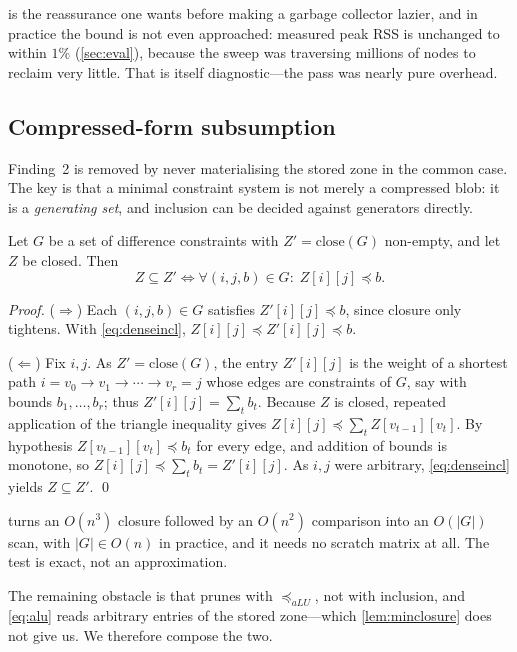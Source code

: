  is the reassurance one wants before making a garbage collector
lazier, and in practice the bound is not even approached: measured peak RSS is
unchanged to within $1\%$ (\cref{sec:eval}), because the sweep was traversing
millions of nodes to reclaim very little.  That is itself diagnostic---the pass
was nearly pure overhead.

\subsection{Compressed-form subsumption}\label{sec:filter}

Finding~2 is removed by never materialising the stored zone in the common case.
The key is that a minimal constraint system is not merely a compressed blob: it
is a \emph{generating set}, and inclusion can be decided against generators
directly.

\begin{lemma}\label{lem:minclosure}
Let $G$ be a set of difference constraints with $Z' = \mathrm{close}(G)$
non-empty, and let $Z$ be closed.  Then
\[
  Z \subseteq Z' \iff \forall (i,j,b) \in G:\; Z[i][j] \preceq b .
\]
\end{lemma}
\begin{proof}
($\Rightarrow$)  Each $(i,j,b) \in G$ satisfies $Z'[i][j] \preceq b$, since
closure only tightens.  With \cref{eq:denseincl}, $Z[i][j] \preceq Z'[i][j]
\preceq b$.

($\Leftarrow$)  Fix $i,j$.  As $Z' = \mathrm{close}(G)$, the entry $Z'[i][j]$ is
the weight of a shortest path $i = v_0 \to v_1 \to \cdots \to v_r = j$ whose
edges are constraints of $G$, say with bounds $b_1,\ldots,b_r$; thus $Z'[i][j] =
\sum_{t} b_t$.  Because $Z$ is closed, repeated application of the triangle
inequality gives $Z[i][j] \preceq \sum_t Z[v_{t-1}][v_t]$.  By hypothesis
$Z[v_{t-1}][v_t] \preceq b_t$ for every edge, and addition of bounds is monotone,
so $Z[i][j] \preceq \sum_t b_t = Z'[i][j]$.  As $i,j$ were arbitrary,
\cref{eq:denseincl} yields $Z \subseteq Z'$. \qed
\end{proof}

 turns an $O(n^3)$ closure followed by an $O(n^2)$
comparison into an $O(|G|)$ scan, with $|G| \in O(n)$ in practice, and it needs
no scratch matrix at all.  The test is exact, not an approximation.

The remaining obstacle is that \tool{} prunes with $\preceq_{aLU}$, not with
inclusion, and \cref{eq:alu} reads arbitrary entries of the stored zone---which
\cref{lem:minclosure} does not give us.  We therefore compose the two.

